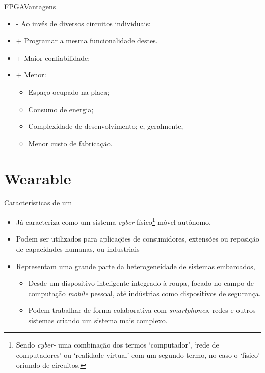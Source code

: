 \begin{frame}{FPGA}{Vantagens \cite{tocci2003sistemas, Plessl2003}}
\begin{itemize} \setlength{\itemsep}{1.2em}
\item - Ao invés de diversos circuitos individuais;
\item + Programar a mesma funcionalidade destes.
\bigskip
\item + Maior confiabilidade;
\item + Menor:
\begin{itemize}
\item Espaço ocupado na placa;
\item Consumo de energia;
\item Complexidade de desenvolvimento; e, geralmente, \item Menor custo de fabricação.
\end{itemize}
\end{itemize}
\end{frame}


\section{Wearable}

\begin{frame}{Características de um \Wearable} \vspace{-1em}
\begin{itemize}
   \setlength{\itemsep}{1.5em}
   \item Já \cite{Jozwiak2017} caracteriza como um sistema \textit{cyber}-físico\footnote{Sendo \textit{cyber-} uma combinação dos termos `computador', `rede de computadores' ou `realidade virtual' com um segundo termo, no caso o `físico' oriundo de circuitos.} móvel autônomo.
   
   \item Podem ser utilizados para aplicações de consumidores, extensões ou reposição de capacidades humanas, ou industriais
   
   \item Representam uma grande parte da heterogeneidade de sistemas embarcados, 
   \begin{itemize}
      \setlength{\itemsep}{1.0em}
      \item Desde um dispositivo inteligente integrado à roupa, focado no campo de computação \textit{mobile} pessoal, até indústrias como dispositivos de segurança. %
      \item Podem trabalhar de forma colaborativa com \textit{smartphones}, redes e outros sistemas criando um sistema mais complexo.
   \end{itemize}
\end{itemize}
\end{frame}


